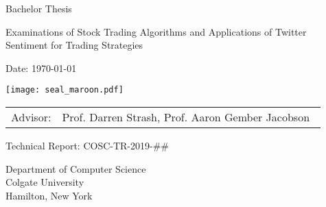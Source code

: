 \documentclass[../thesis.tex]{subfiles}
\begin{document}
\pagestyle{empty}

\begin{titlepage}
	\begin{center}\large

		\vfill
		\vfill
		\vfill
		\vfill

		Bachelor Thesis
		\vspace*{1.35cm}

		{\bfseries{\Large{Examinations of Stock Trading Algorithms and Applications of Twitter Sentiment for Trading Strategies \par}}}

		\vspace*{1.35cm}

		\theauthor

		\vspace*{6.0mm}

		Date: \today 

		\vspace*{6.0mm}

        \texttt{[image: seal\_maroon.pdf]}

		\vspace*{6.0mm}
		\begin{tabular}{rl}
			Advisor: & Prof. Darren Strash, Prof. Aaron Gember Jacobson\
		\end{tabular}

		\vspace*{7mm}

        Technical Report: COSC-TR-2019-\#\#


		\vspace*{7mm}
		Department of Computer Science \\
		Colgate University \\
		Hamilton, New York

		\vspace*{12mm}
		\vfill
	\end{center}

\end{titlepage}
\end{document}
